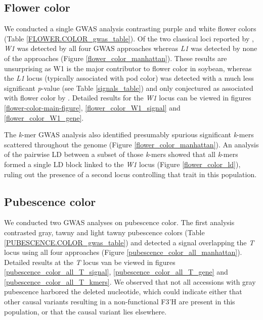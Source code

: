 \subsection*{Flower color}
\label{sv-gwas-flower-color}

We conducted a single GWAS analysis contrasting purple and white flower colors
(Table \ref{FLOWER.COLOR_gwas_table}). Of the two classical loci reported by
\cite{bandillo2017}, \textit{W1} was detected by all four GWAS approaches whereas
\textit{L1} was detected by none of the approaches (Figure
\ref{flower_color_manhattan}). These results are unsurprising as W1 is the
major contributor to flower color in soybean, whereas the \textit{L1} locus
(typically associated with pod color) was detected with a much less significant
\textit{p}-value (see Table \ref{signals_table}) and only conjectured as
associated with flower color by \cite{bandillo2017}. Detailed results for the
\textit{W1} locus can be viewed in figures \ref{flower-color-main-figure},
\ref{flower_color_W1_signal} and \ref{flower_color_W1_gene}.

The \textit{k}-mer GWAS analysis also identified presumably spurious significant
\textit{k}-mers scattered throughout the genome (Figure
\ref{flower_color_manhattan}). An analysis of the pairwise LD between a subset
of those \textit{k}-mers showed that all \textit{k}-mers formed a single LD block
linked to the \textit{W1} locus (Figure \ref{flower_color_ld}), ruling out the
presence of a second locus controlling that trait in this population.

\subsection*{Pubescence color}
\label{sv-gwas-pubescence-color}

We conducted two GWAS analyses on pubescence color. The first analysis
contrasted gray, tawny and light tawny pubescence colors (Table
\ref{PUBESCENCE.COLOR_gwas_table}) and detected a signal overlapping the
\emph{T} locus using all four approaches (Figure
\ref{pubescence_color_all_manhattan}). Detailed results at the \textit{T} locus
van be viewed in figures \ref{pubescence_color_all_T_signal},
\ref{pubescence_color_all_T_gene} and \ref{pubescence_color_all_T_kmers}. We
observed that not all accessions with gray pubescence harbored the deleted
nucleotide, which could indicate either that other causal variants resulting in
a non-functional F3’H are present in this population, or that the causal
variant lies elsewhere.

